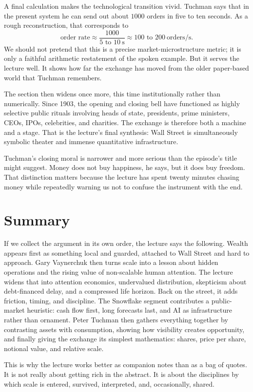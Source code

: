 A final calculation makes the technological transition vivid. Tuchman says that in the present system he can send out about $1000$ orders in five to ten seconds. As a rough reconstruction, that corresponds to
\begin{equation}
\text{order rate} \approx \frac{1000}{5\text{ to }10\ \mathrm{s}} \approx 100\text{ to }200\ \mathrm{orders/s}.
\end{equation}
We should not pretend that this is a precise market-microstructure metric; it is only a faithful arithmetic restatement of the spoken example. But it serves the lecture well. It shows how far the exchange has moved from the older paper-based world that Tuchman remembers.

The section then widens once more, this time institutionally rather than numerically. Since 1903, the opening and closing bell have functioned as highly selective public rituals involving heads of state, presidents, prime ministers, CEOs, IPOs, celebrities, and charities. The exchange is therefore both a machine and a stage. That is the lecture's final synthesis: Wall Street is simultaneously symbolic theater and immense quantitative infrastructure.

Tuchman's closing moral is narrower and more serious than the episode's title might suggest. Money does not buy happiness, he says, but it does buy freedom. That distinction matters because the lecture has spent twenty minutes chasing money while repeatedly warning us not to confuse the instrument with the end.

\section{Summary}

If we collect the argument in its own order, the lecture says the following. Wealth appears first as something local and guarded, attached to Wall Street and hard to approach. Gary Vaynerchuk then turns scale into a lesson about hidden operations and the rising value of non-scalable human attention. The lecture widens that into attention economics, undervalued distribution, skepticism about debt-financed delay, and a compressed life horizon. Back on the street, it adds friction, timing, and discipline. The Snowflake segment contributes a public-market heuristic: cash flow first, long forecasts last, and AI as infrastructure rather than ornament. Peter Tuchman then gathers everything together by contrasting assets with consumption, showing how visibility creates opportunity, and finally giving the exchange its simplest mathematics: shares, price per share, notional value, and relative scale.

This is why the lecture works better as companion notes than as a bag of quotes. It is not really about getting rich in the abstract. It is about the disciplines by which scale is entered, survived, interpreted, and, occasionally, shared.